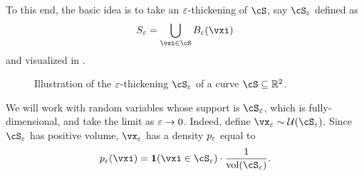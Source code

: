 \documentclass[../../book-main.tex]{subfiles}
\begin{document}
To this end, the basic idea is to take an \(\varepsilon\)-thickening of \(\cS\), say \(\cS_{\eps}\) defined as 
\begin{equation}
    S_{\eps} = \bigcup_{\vxi \in \cS}B_{\eps}(\vxi)
\end{equation}
and visualized in .
\begin{figure}[th]
    \centering
    \caption{Illustration of the \(\varepsilon\)-thickening \(\cS_\eps\) of a curve \(\cS \subseteq \R^{2}\).}
    \label{fig:entropy_eps_thickening}
\end{figure}
We will work with random variables whose support is \(\cS_{\eps}\), which is fully-dimensional, and take the limit as \(\varepsilon \to 0\). Indeed, define \(\vx_{\eps} \sim \dUnif(\cS_{\eps})\). Since \(\cS_{\eps}\) has positive volume, \(\vx_{\eps}\) has a density \(p_{\varepsilon}\) equal to
\begin{equation}
    p_{\eps}(\vxi) = \indvar(\vxi \in \cS_{\eps}) \cdot \frac{1}{\volume(\cS_{\eps})}.
\end{equation}
\end{document}
